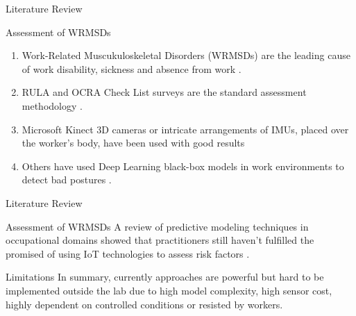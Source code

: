 \begin{frame}{Literature Review}
    \begin{alertblock}{Assessment of WRMSDs}
    \begin{enumerate}%
    \item Work-Related Muscukuloskeletal Disorders (WRMSDs) are the leading cause of work disability, sickness and absence from work \cite{Bevan2015}.
    \item RULA and OCRA Check List surveys are the standard assessment methodology \cite{McAtamney1993, Occhipinti1998}.
    \item Microsoft Kinect 3D cameras or intricate arrangements of IMUs, placed over the worker's body, have been used with good results \cite{Vignais2013,Buisseret2018, Chen2018}
    \item Others have used Deep Learning black-box models in work environments to detect bad postures \cite{Barkallah2017,Abobakr2017,Hu2018}.
    \end{enumerate}
    \end{alertblock}
\end{frame}

\begin{frame}{Literature Review}
    \begin{alertblock}{Assessment of WRMSDs}
        A review of predictive modeling techniques in occupational domains showed that practitioners still
        haven't fulfilled the promised of using IoT technologies to assess risk factors \cite{Lim2020}.
    \end{alertblock}
    \begin{alertblock}{Limitations}
        In summary, currently approaches are powerful but hard to be implemented outside the lab due to high model complexity, high sensor cost,
        highly dependent on controlled conditions or resisted by workers.
    \end{alertblock}
\end{frame}



